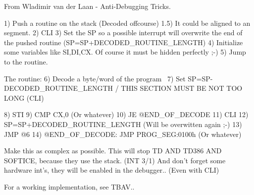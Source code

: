 From  Wladimir van der Laan  -   Anti-Debugging Tricks.

1) Push a routine on the stack (Decoded offcourse)
1.5) It could be aligned to an segment.
2) CLI
3) Set the SP so a possible interrupt will overwrite the end of the pushed
routine (SP=SP+DECODED_ROUTINE_LENGTH)
4) Initialize some variables like SI,DI,CX. Of course it must be hidden
perfectly ;-)
5) Jump to the routine.

The routine:
6) Decode a byte/word of the program \
7) Set SP=SP-DECODED_ROUTINE_LENGTH  / THIS SECTION MUST BE NOT TOO LONG (CLI)

8) STI
9) CMP CX,0 (Or whatever)
10) JE @END_OF_DECODE
11) CLI
12) SP=SP+DECODED_ROUTINE_LENGTH (Will be overwitten again ;-)
13) JMP @6
14) @END_OF_DECODE: JMP PROG_SEG:0100h (Or whatever)

Make this as complex as possible. This will stop TD AND TD386 AND SOFTICE,
because they use the stack. (INT 3/1) And don't forget some hardware int's, they
will be enabled in the debugger.. (Even with CLI)

For a working implementation, see TBAV..


